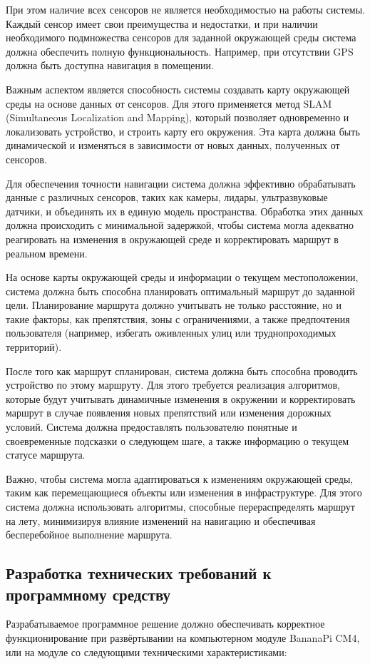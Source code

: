 При этом наличие всех сенсоров не является необходимостью на работы системы.
Каждый сенсор имеет свои преимущества и недостатки, и при наличии необходимого
подмножества сенсоров для заданной окружающей среды система должна обеспечить
полную функциональность. Например, при отсутствии GPS должна быть доступна
навигация в помещении.

Важным аспектом является способность системы создавать карту окружающей среды на
основе данных от сенсоров. Для этого применяется метод SLAM (Simultaneous
Localization and Mapping), который позволяет одновременно и локализовать
устройство, и строить карту его окружения. Эта карта должна быть динамической и
изменяться в зависимости от новых данных, полученных от сенсоров.

Для обеспечения точности навигации система должна эффективно обрабатывать данные
с различных сенсоров, таких как камеры, лидары, ультразвуковые датчики, и
объединять их в единую модель пространства. Обработка этих данных должна
происходить с минимальной задержкой, чтобы система могла адекватно реагировать
на изменения в окружающей среде и корректировать маршрут в реальном времени.

На основе карты окружающей среды и информации о текущем местоположении, система
должна быть способна планировать оптимальный маршрут до заданной цели.
Планирование маршрута должно учитывать не только расстояние, но и такие факторы,
как препятствия, зоны с ограничениями, а также предпочтения пользователя
(например, избегать оживленных улиц или труднопроходимых территорий).

После того как маршрут спланирован, система должна быть способна проводить
устройство по этому маршруту. Для этого требуется реализация алгоритмов, которые
будут учитывать динамичные изменения в окружении и корректировать маршрут в
случае появления новых препятствий или изменения дорожных условий. Система
должна предоставлять пользователю понятные и своевременные подсказки о следующем
шаге, а также информацию о текущем статусе маршрута.

Важно, чтобы система могла адаптироваться к изменениям окружающей среды, таким
как перемещающиеся объекты или изменения в инфраструктуре. Для этого система
должна использовать алгоритмы, способные перераспределять маршрут на лету,
минимизируя влияние изменений на навигацию и обеспечивая бесперебойное
выполнение маршрута.

\subsection{Разработка технических требований к программному средству}
Разрабатываемое программное решение должно обеспечивать корректное
функционирование при развёртывании на компьютерном модуле BananaPi CM4, или
на модуле со следующими техническими характеристиками:

